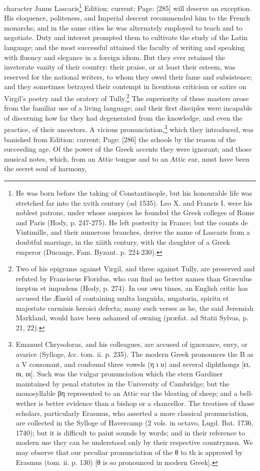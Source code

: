character Janus Lascaris\footnote{He was born before the taking of Constantinople, but his honourable life was stretched far into the xvith century (ad 1535). Leo X. and Francis I. were his noblest patrons, under whose auspices he founded the Greek colleges of Rome and Paris (Hody, p. 247-275). He left posterity in France; but the counts de Vintimille, and their numerous branches, derive the name of Lascaris from a doubtful marriage, in the xiiith century, with the daughter of a Greek emperor (Ducange, Fam. Byzant. p. 224-230).} Edition: current; Page: [285] will deserve an exception. His eloquence, politeness, and Imperial descent recommended him to the French monarchs; and in the same cities he was alternately employed to teach and to negotiate. Duty and interest prompted them to cultivate the study of the Latin language; and the most successful attained the faculty of writing and speaking with fluency and elegance in a foreign idiom. But they ever retained the inveterate vanity of their country: their praise, or at least their esteem, was reserved for the national writers, to whom they owed their fame and subsistence; and they sometimes betrayed their contempt in licentious criticism or satire on Virgil\texthebrew{}’s poetry and the oratory of Tully.\footnote{Two of his epigrams against Virgil, and three against Tully, are preserved and refuted by Franciscus Floridus, who can find no better names than Græculus ineptus et impudens (Hody, p. 274). In our own times, an English critic has accused the Æneid of containing multa languida, nugatoria, spiritu et majestate carminis heroici defecta; many such verses as he, the said Jeremiah Markland, would have been ashamed of owning (præfat. ad Statii Sylvas, p. 21, 22).} The superiority of these masters arose from the familiar use of a living language; and their first disciples were incapable of discerning how far they had degenerated from the knowledge, and even the practice, of their ancestors. A vicious pronunciation,\footnote{Emanuel Chrysoloras, and his colleagues, are accused of ignorance, envy, or avarice (Sylloge, \&c. tom. ii. p. 235). The modern Greek pronounces the B as a V consonant, and confound three vowels (\textgreek{η ι υ}) and several diphthongs [\textgreek{ει, οι, υι}]. Such was the vulgar pronunciation which the stern Gardiner maintained by penal statutes in the University of Cambridge; but the monosyllable \textgreek{βη} represented to an Attic ear the bleating of sheep; and a bell-wether is better evidence than a bishop or a chancellor. The treatises of those scholars, particularly Erasmus, who asserted a more classical pronunciation, are collected in the Sylloge of Havercamp (2 vols. in octavo, Lugd. Bat. 1736, 1740); but it is difficult to paint sounds by words; and in their reference to modern use they can be understood only by their respective countrymen. We may observe that our peculiar pronunciation of the \textgreek{θ} to th is approved by Erasmus (tom. ii. p. 130) [\textgreek{θ} is so pronounced in modern Greek].} which they introduced, was banished from Edition: current; Page: [286] the schools by the reason of the succeeding age. Of the power of the Greek accents they were ignorant; and those musical notes, which, from an Attic tongue and to an Attic ear, must have been the secret soul of harmony, 